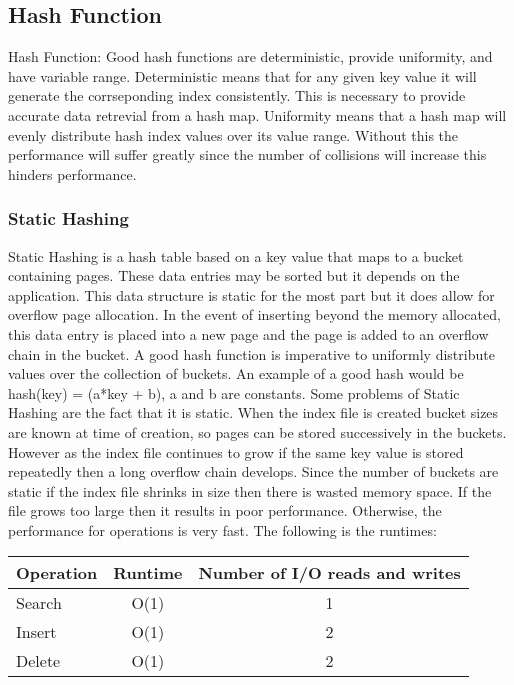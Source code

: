 \documentclass[letterpaper, 12pt]{article}
\begin{document}
\subsection{Hash Function}
Hash Function:
Good hash functions are deterministic, provide uniformity, and have variable range. Deterministic means 
that for any given key value it will generate the corrseponding index consistently. This is 
necessary to provide accurate data retrevial from a hash map. Uniformity means that a hash 
map will evenly distribute hash index values over its value range. Without this the 
performance will suffer greatly since the number of collisions will increase this hinders performance. 
\subsubsection{Static Hashing}
Static Hashing is a hash table based on a key value that maps to a bucket containing pages. These 
data entries may be sorted but it depends on the application. This data structure is static 
for the most part but it does allow for overflow page allocation. In the event of inserting 
beyond the memory allocated, this data entry is placed into a new page and the page is added 
to an overflow chain in the bucket.
A good hash function is imperative to uniformly distribute values over the collection of buckets. 
An example of a good hash would be hash(key) = (a*key + b), a and b are constants. Some problems 
of Static Hashing are the fact that it is static. When the index file is created bucket sizes 
are known at time of creation, so pages can be stored successively in the buckets. However 
as the index file continues to grow if the same key value is stored repeatedly then a long 
overflow chain develops. Since the number of buckets are static if the index file shrinks 
in size then there is wasted memory space. If the file grows too large then it results in 
poor performance. Otherwise, the performance for operations is very fast. The following 
is the runtimes:

\par\vspace{\baselineskip}

\begin{tabular}{l | c | c}
  Operation & Runtime & Number of I/O reads and writes \\ \hline \hline
  Search & O(1) & 1  \\ \hline
  Insert & O(1) & 2  \\ \hline
  Delete & O(1) & 2  \\ \hline
\end{tabular}
\end{document}
